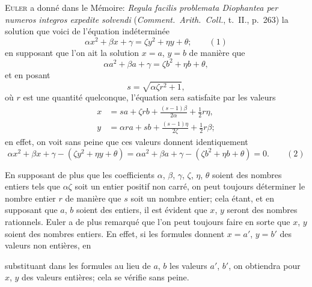 \documentclass[11pt]{article}
\begin{document}
\medskip

\textsc{Euler} a donn\'e dans le M\'emoire: \emph{Regula facilis problemata Diophantea per numeros integros expedite solvendi} (\emph{Comment.\ Arith.\ Coll.}, t.\ II., p.\ 263) la solution que voici de l'\'equation ind\'etermin\'ee
\[
\alpha x^{2}+\beta x+\gamma=\zeta y^{2}+\eta y+\theta;\qquad(1)
\]
en supposant que l'on ait la solution $x=a$, $y=b$ de mani\`ere que
\[
\alpha a^{2}+\beta a+\gamma=\zeta b^{2}+\eta b+\theta,
\]
et en posant
\[
s=\sqrt{\alpha\zeta r^{2}+1},
\]
o\`u $r$ est une quantit\'e quelconque, l'\'equation sera satisfaite par les valeurs
\[
\begin{aligned}
x &= sa + \zeta r b + \tfrac{(s-1)\beta}{2\alpha} + \tfrac{1}{2}r\eta,\\[2pt]
y &= \alpha r a + s b + \tfrac{(s-1)\eta}{2\zeta} + \tfrac{1}{2}r\beta;
\end{aligned}
\]
en effet, on voit sans peine que ces valeurs donnent identiquement
\[
\alpha x^{2}+\beta x+\gamma-(\zeta y^{2}+\eta y+\theta)=\alpha a^{2}+\beta a+\gamma-(\zeta b^{2}+\eta b+\theta)=0.\qquad(2)
\]

En supposant de plus que les coefficients $\alpha$, $\beta$, $\gamma$, $\zeta$, $\eta$, $\theta$ soient des nombres entiers tels que $\alpha\zeta$ soit un entier positif non carr\'e, on peut toujours d\'eterminer le nombre entier $r$ de mani\`ere que $s$ soit un nombre entier; cela \'etant, et en supposant que $a$, $b$ soient des entiers, il est \'evident que $x$, $y$ seront des nombres rationnels. Euler a de plus remarqu\'e que l'on peut toujours faire en sorte que $x$, $y$ soient des nombres entiers. En effet, si les formules donnent $x=a'$, $y=b'$ des valeurs non enti\`eres, en

\clearpage

substituant dans les formules au lieu de $a$, $b$ les valeurs $a'$, $b'$, on obtiendra pour $x$, $y$ des valeurs enti\`eres; cela se v\'erifie sans peine.
\end{document}
